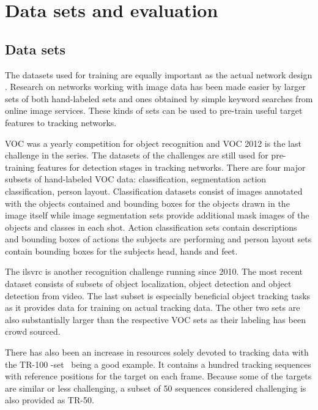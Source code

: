 \section{Data sets and evaluation}

\subsection{Data sets}
The datasets used for training are equally important as the actual network design
.
Research on networks working with image data has been made easier by larger sets of both
hand-labeled sets and ones obtained by simple keyword searches from online image services.
These kinds of sets can be used to pre-train useful target features to tracking networks.

VOC was a yearly competition for object recognition and VOC 2012 \cite{VOC12} is the last challenge
in the series. The datasets of the challenges are still used for pre-training features
for detection stages in tracking networks. There are four major subsets of hand-labeled
VOC data: classification, segmentation action classification, person layout.
Classification datasets consist of images annotated with the objects contained and
bounding boxes for the objects drawn in the image itself while image segmentation sets
provide additional mask images of the objects and classes in each shot. Action classification
sets contain descriptions and bounding boxes of actions the subjects are performing and
person layout sets contain bounding boxes for the subjects head, hands and feet.

The \ac{ilsvrc} \cite{ILSVRC15} is another recognition challenge running since 2010. The
most recent dataset consists of subsets of object localization, object detection and
object detection from video. The last subset is especially beneficial object tracking
tasks as it provides data for training on actual tracking data. The other two sets are also
substantially larger than the respective VOC sets as their labeling has been crowd sourced. 

There has also been an increase in resources solely devoted to tracking data with the
TR-100 -set~\cite{VTB} being a good example. It contains a hundred tracking sequences
with reference positions for the target on each frame. Because some of the targets are
similar or less challenging, a subset of 50 sequences considered challenging is also
provided as TR-50.~\cite{OT_BENCH}

